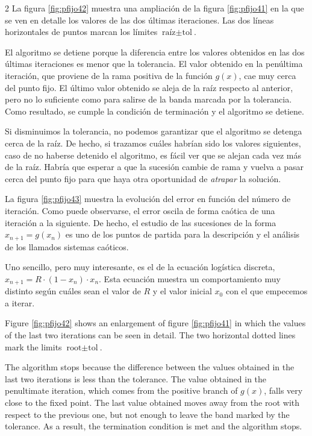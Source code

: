 \begin{paracol}{2}
 La figura \ref{fig:pfijo42} muestra una ampliación de la figura \ref{fig:pfijo41} en la que se ven en detalle los valores de las dos últimas iteraciones. Las dos líneas horizontales de puntos marcan los límites $\text{raíz}\pm \text{tol}$.

 El algoritmo se detiene porque la diferencia entre los valores obtenidos en las dos últimas iteraciones es menor que la tolerancia. El valor obtenido en la penúltima iteración, que proviene de la rama positiva de la función $g(x)$, cae muy cerca del punto fijo. El último valor obtenido se aleja de la raíz respecto al anterior, pero no lo suficiente como para salirse de la banda marcada por la tolerancia. Como resultado, se cumple la condición de terminación y el algoritmo se detiene.

 Si disminuimos la tolerancia, no podemos garantizar que el algoritmo se detenga cerca de la raíz. De hecho, si trazamos cuáles habrían sido los valores siguientes, caso de no haberse detenido el algoritmo, es fácil ver que se alejan cada vez más de la raíz. Habría que esperar a que la sucesión cambie de rama y vuelva a pasar cerca del punto fijo para que haya otra oportunidad de \emph{atrapar} la solución.

  La figura \ref{fig:pfijo43} muestra la evolución del error en función del número de iteración. Como puede observarse, el error oscila de forma caótica de una iteración a la siguiente. De hecho, el estudio de las sucesiones de la forma $x_{n+1}=g(x_n)$ es uno de los puntos de partida para la descripción y el análisis de los llamados sistemas caóticos.

Uno sencillo, pero muy interesante, es el de la ecuación logística discreta, $x_{n+1}=R\cdot (1-x_n)\cdot x_n$. Esta ecuación muestra un comportamiento muy distinto según cuáles sean el valor de $R$ y el valor inicial $x_0$ con el que empecemos a iterar.

\switchcolumn

Figure \ref{fig:pfijo42} shows an enlargement of figure \ref{fig:pfijo41} in which the values of the last two iterations can be seen in detail. The two horizontal dotted lines mark the limits $\text{root}\pm \text{tol}$.

 The algorithm stops because the difference between the values obtained in the last two iterations is less than the tolerance. The value obtained in the penultimate iteration, which comes from the positive branch of $g(x)$, falls very close to the fixed point. The last value obtained moves away from the root with respect to the previous one, but not enough to leave the band marked by the tolerance. As a result, the termination condition is met and the algorithm stops.


\end{paracol}
